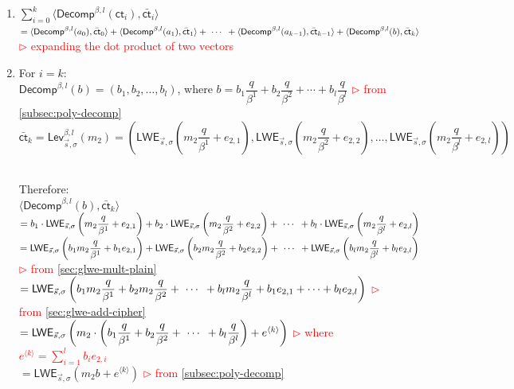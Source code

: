 \begin{myproof}
\begin{enumerate}
\item $\sum\limits_{i=0}^{k}\langle \textsf{Decomp}^{\beta, l}(\textsf{ct}_i), \bar{\textsf{ct}}_i \rangle$ \\
$= \langle \textsf{Decomp}^{\beta, l}(a_0), \bar{\textsf{ct}}_0 \rangle + \langle \textsf{Decomp}^{\beta, l}(a_1), \bar{\textsf{ct}}_1 \rangle + \text{ } \text{$\cdots$} \text{ } + \langle \textsf{Decomp}^{\beta, l}(a_{k-1}), \bar{\textsf{ct}}_{k-1} \rangle + \langle \textsf{Decomp}^{\beta, l}(b), \bar{\textsf{ct}}_k \rangle$ \\
\textcolor{red}{ $\rhd$ expanding the dot product of two vectors}
\item For $i = k$: \\
$\textsf{Decomp}^{\beta, l}(b) = (b_1, b_2, \ldots , b_l)$, where $b = b_1\dfrac{q}{\beta^1} + b_2\dfrac{q}{\beta^2} + \cdots + b_l\dfrac{q}{\beta^l}$ \textcolor{red}{ $\rhd$ from \autoref{subsec:poly-decomp}}\\
$\bar{\textsf{ct}}_k = \textsf{Lev}_{\vec{s}, \sigma}^{\beta, l}(m_2) = \left(\textsf{LWE}_{\vec{s}, \sigma}\left(m_{2}\dfrac{q}{\beta^1} + e_{2, 1}\right), \textsf{LWE}_{\vec{s}, \sigma}\left(m_{2}\dfrac{q}{\beta^2} + e_{2, 2}\right), \ldots, \textsf{LWE}_{\vec{s}, \sigma}\left(m_{2}\dfrac{q}{\beta^l} + e_{2, l}\right) \right)$ \\
$ $

Therefore: \\
$\langle \textsf{Decomp}^{\beta, l}(b), \bar{\textsf{ct}}_k \rangle$\\
$= b_1 \cdot \textsf{LWE}_{\vec{s}, \sigma} \left (m_{2}\dfrac{q}{\beta^1}  + e_{2, 1}\right ) + b_2 \cdot \textsf{LWE}_{\vec{s}, \sigma} \left (m_{2}\dfrac{q}{\beta^2}  + e_{2, 2}\right ) + \text{ } \text{$\cdots$} \text{ } + b_l \cdot \textsf{LWE}_{\vec{s}, \sigma} \left (m_{2}\dfrac{q}{\beta^l}  + e_{2, l}\right)$ \\
$= \textsf{LWE}_{\vec{s}, \sigma} \left (b_1m_{2}\dfrac{q}{\beta^1}  + b_1e_{2, 1}\right ) + \textsf{LWE}_{\vec{s}, \sigma} \left (b_2m_{2}\dfrac{q}{\beta^2}  + b_2e_{2,2}\right ) + \text{ } \text{$\cdots$} \text{ } + \textsf{LWE}_{\vec{s}, \sigma} \left (b_lm_{2}\dfrac{q}{\beta^l} + b_le_{2, l}\right)$ \textcolor{red}{ $\rhd$ from \autoref{sec:glwe-mult-plain}} \\
$= \textsf{LWE}_{\vec{s}, \sigma} \left (b_1m_{2}\dfrac{q}{\beta^1} + b_2m_{2}\dfrac{q}{\beta^2} + \text{ } \text{$\cdots$} \text{ } + b_lm_{2}\dfrac{q}{\beta^l} + b_1e_{2,1} + \cdots + b_le_{2,l}\right)$ \textcolor{red}{ $\rhd$ from \autoref{sec:glwe-add-cipher}}\\
$= \textsf{LWE}_{\vec{s}, \sigma} \left (m_{2} \cdot \left ( b_1\dfrac{q}{\beta^1} + b_2\dfrac{q}{\beta^2} + \text{ } \text{$\cdots$} \text{ } + b_l\dfrac{q}{\beta^l} \right)+e^{\langle k \rangle}\right)$ \textcolor{red}{ $\rhd$ where $e^{\langle k \rangle} = \sum\limits_{i=1}^{l}b_ie_{2, i}$}\\
$= \textsf{LWE}_{\vec{s}, \sigma} (m_{2}b + e^{\langle k \rangle})$ \textcolor{red}{ $\rhd$ from \autoref{subsec:poly-decomp}}


\end{enumerate}
\end{myproof}
